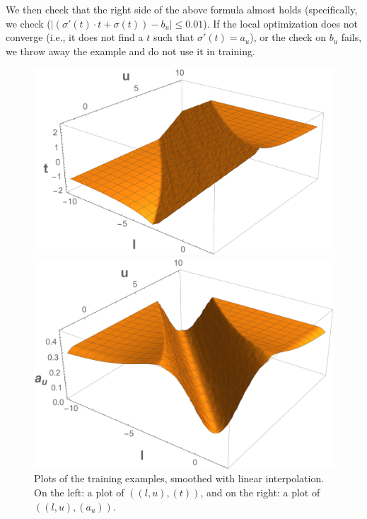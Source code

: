 We then check that the right side of the above formula almost holds
(specifically, we check ($ |(\sigma'(t)\cdot t + \sigma(t)) - b_u
| \leq 0.01 $). If the local optimization does not converge (i.e., it
does not find a $ t $ such that $ \sigma'(t) = a_u $), or the check on
$ b_u $ fails, we throw away the example and do not use it in
training.
\begin{figure}[t]
	\centering
	\begin{minipage}{.48\linewidth}
		\centering
		\includegraphics[width=\linewidth]{offlinesyn/figs/tanplot.pdf}
	\end{minipage}\hspace{12pt}%
	\begin{minipage}{.48\linewidth}
		\centering
		\includegraphics[width=\linewidth]{offlinesyn/figs/aplot.pdf}
	\end{minipage}
	\caption{Plots of the training examples, smoothed with linear
	interpolation. On the left: a plot of $ ((l, u), (t)) $, and on the right:
	a plot of $ ((l, u), (a_u)). $\label{offlinesyn:fig:targetfunc}}
	\label{offlinesyn:fig:funcstolearn}
\end{figure}

